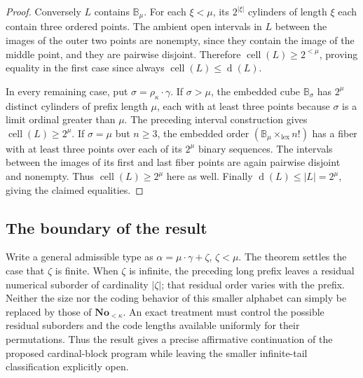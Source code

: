 \documentclass[11pt]{article}
\theoremstyle{definition}
\theoremstyle{remark}
\newcommand{\No}{\mathbf{No}}
\newcommand{\B}{\mathbb B}
\newcommand{\lex}{\mathrm{lex}}
\newcommand{\dens}{\operatorname{d}}
\newcommand{\cell}{\operatorname{cell}}
\begin{document}
\begin{proof}
Conversely $L$ contains $\B_\mu$.  For each $\xi<\mu$, its
$2^{|\xi|}$ cylinders of length $\xi$ each contain three ordered
points.  The ambient open intervals in $L$ between the images of
the outer two points are nonempty, since they contain the image of
the middle point, and they are pairwise disjoint.  Therefore
$\cell(L)\geq2^{<\mu}$, proving equality in the first
case since always $\cell(L)\leq \dens(L)$.

In every remaining case, put $\sigma=\rho_\kappa\cdot\gamma$.
If $\sigma>\mu$, the embedded cube $\B_\sigma$ has $2^\mu$
distinct cylinders of prefix length $\mu$, each with at least three
points because $\sigma$ is a limit ordinal greater than $\mu$.
The preceding interval construction gives $\cell(L)\geq2^\mu$.
If $\sigma=\mu$ but $n\geq3$, the embedded order $(\B_{\mu}\times_{\lex}n!)$
has a fiber with at least three points over each of its $2^\mu$
binary sequences.  The intervals between the images of its first
and last fiber points are again pairwise disjoint and nonempty.
Thus $\cell(L)\geq2^\mu$ here as well.  Finally
$\dens(L)\leq|L|=2^\mu$, giving the claimed equalities.
\end{proof}

\subsection{The boundary of the result}
\label{swo:vi:sub:cb-boundary}

Write a general admissible type as
$\alpha=\mu\cdot\gamma+\zeta$, $\zeta<\mu$.
The theorem settles the case that $\zeta$ is finite.  When $\zeta$
is infinite, the preceding long prefix leaves a residual numerical
suborder of cardinality $|\zeta|$; that residual order varies with
the prefix.  Neither the size nor the coding behavior of this smaller
alphabet can simply be replaced by those of $\No_{<\kappa}$.
An exact treatment must control the possible residual suborders and
the code lengths available uniformly for their permutations.  Thus
the result gives a precise affirmative continuation of the proposed
cardinal-block program while leaving the smaller infinite-tail
classification explicitly open.
\end{document}

